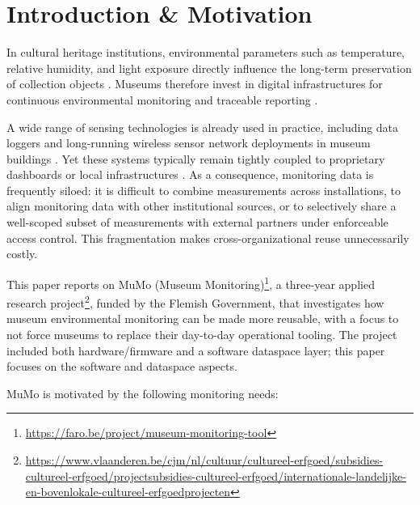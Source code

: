 \documentclass{ceurart}
\begin{document}
\maketitle

\section{Introduction \& Motivation}\label{sec:intro}

In cultural heritage institutions, environmental parameters such as
temperature, relative humidity, and light exposure directly influence
the long-term preservation of collection objects
\citep{laborda2022concept}. Museums therefore invest in digital
infrastructures for continuous environmental monitoring and traceable
reporting \citep{laborda2022concept, michalski2007ideal}.

A wide range of sensing technologies is already used in practice,
including data loggers and long-running wireless sensor network
deployments in museum buildings \citep{rodriguez2010integrating}. Yet
these systems typically remain tightly coupled to proprietary dashboards
or local infrastructures \citep{Monitoring2025}. As a consequence,
monitoring data is frequently siloed: it is difficult to combine
measurements across installations, to align monitoring data with other
institutional sources, or to selectively share a well-scoped subset of
measurements with external partners under enforceable access control.
This fragmentation makes cross-organizational reuse unnecessarily
costly.

This paper reports on MuMo (Museum
Monitoring)\footnote{\url{https://faro.be/project/museum-monitoring-tool}},
a three-year applied research
project\footnote{\url{https://www.vlaanderen.be/cjm/nl/cultuur/cultureel-erfgoed/subsidies-cultureel-erfgoed/projectsubsidies-cultureel-erfgoed/internationale-landelijke-en-bovenlokale-cultureel-erfgoedprojecten}},
funded by the Flemish Government, that investigates how museum
environmental monitoring can be made more reusable, with a focus to not
force museums to replace their day-to-day operational tooling. The
project included both hardware/firmware and a software dataspace layer;
this paper focuses on the software and dataspace aspects.

MuMo is motivated by the following monitoring needs:
\end{document}
